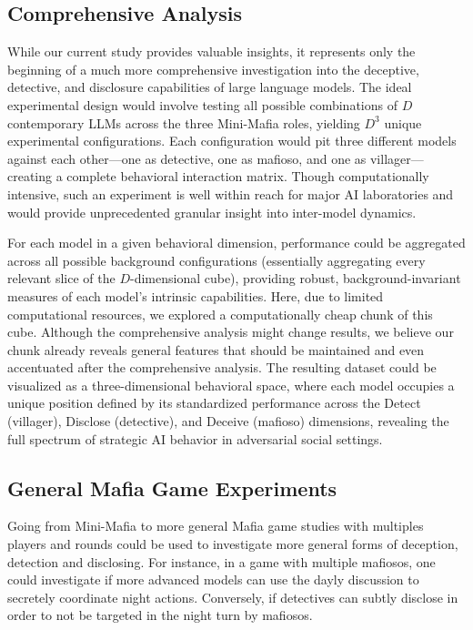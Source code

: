 \documentclass{article}
\begin{document}
\subsection{Comprehensive Analysis}

While our current study provides valuable insights, it represents only the beginning of a much more comprehensive investigation into the deceptive, detective, and disclosure capabilities of large language models. The ideal experimental design would involve testing all possible combinations of $D$ contemporary LLMs across the three Mini-Mafia roles, yielding $D^3$ unique experimental configurations. Each configuration would pit three different models against each other—one as detective, one as mafioso, and one as villager—creating a complete behavioral interaction matrix. Though computationally intensive, such an experiment is well within reach for major AI laboratories and would provide unprecedented granular insight into inter-model dynamics.

For each model in a given behavioral dimension, performance could be aggregated across all possible background configurations (essentially aggregating every relevant slice of the $D$-dimensional cube), providing robust, background-invariant measures of each model's intrinsic capabilities. Here, due to limited computational resources, we explored a computationally cheap chunk of this cube. Although the comprehensive analysis might change results, we believe our chunk already reveals general features that should be maintained and even accentuated after the comprehensive analysis. The resulting dataset could be visualized as a three-dimensional behavioral space, where each model occupies a unique position defined by its standardized performance across the Detect (villager), Disclose (detective), and Deceive (mafioso) dimensions, revealing the full spectrum of strategic AI behavior in adversarial social settings.


\subsection{General Mafia Game Experiments}

Going from Mini-Mafia to more general Mafia game studies with multiples players and rounds could be used to investigate more general forms of deception, detection and disclosing. For instance, in a game with multiple mafiosos, one could investigate if more advanced models can use the dayly discussion to secretely coordinate night actions. Conversely, if detectives can subtly disclose in order to not be targeted in the night turn by mafiosos. 
\end{document}
